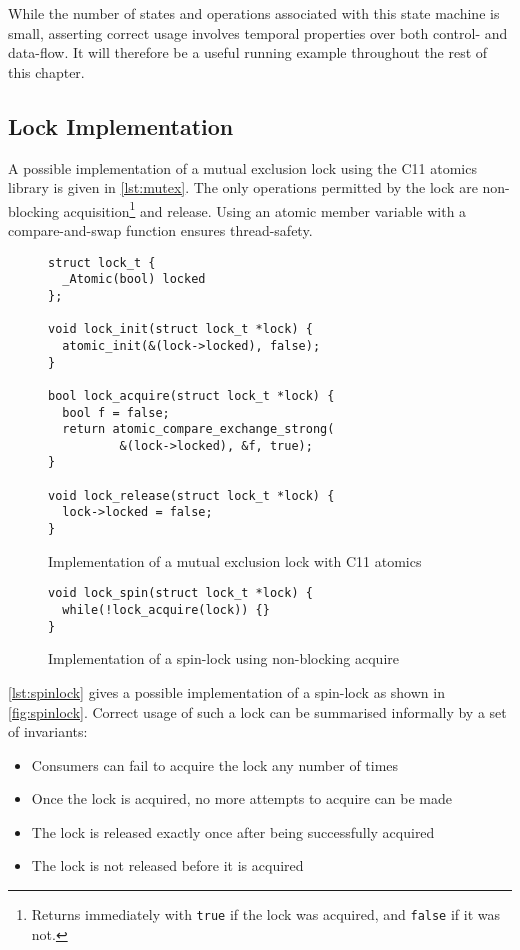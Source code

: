 While the number of states and operations associated with this state machine is
small, asserting correct usage involves temporal properties over both control-
and data-flow. It will therefore be a useful running example throughout the rest
of this chapter.

\subsection{Lock Implementation}

A possible implementation of a mutual exclusion lock using the C11
atomics library is given in \autoref{lst:mutex}. The only operations
permitted by the lock are non-blocking acquisition\footnote{Returns immediately
with \texttt{true} if the lock was acquired, and
\texttt{false} if it was not.} and release. Using an atomic
member variable with a compare-and-swap function ensures thread-safety.

\begin{figure}
  \begin{verbatim}
struct lock_t {
  _Atomic(bool) locked
};

void lock_init(struct lock_t *lock) {
  atomic_init(&(lock->locked), false);
}

bool lock_acquire(struct lock_t *lock) {
  bool f = false;
  return atomic_compare_exchange_strong(
          &(lock->locked), &f, true);
}

void lock_release(struct lock_t *lock) {
  lock->locked = false;
}
  \end{verbatim}
  \caption{Implementation of a mutual exclusion lock with C11 atomics}
  \label{lst:mutex}
\end{figure}

\begin{figure}
  \begin{verbatim}
void lock_spin(struct lock_t *lock) {
  while(!lock_acquire(lock)) {}
}
  \end{verbatim}
  \caption{Implementation of a spin-lock using non-blocking acquire}
  \label{lst:spinlock}
\end{figure}

\autoref{lst:spinlock} gives a possible implementation of a spin-lock as shown
in \autoref{fig:spinlock}.
Correct usage of such a lock can be summarised informally by a set of
invariants:
\begin{itemize}
  \item Consumers can fail to acquire the lock any number of times
  \item Once the lock is acquired, no more attempts to acquire can be made
  \item The lock is released exactly once after being successfully acquired
  \item The lock is not released before it is acquired
\end{itemize}

